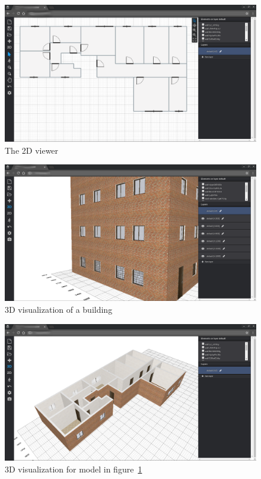 \begin{figure}[htb]
\centering
\includegraphics[width=\linewidth]{contents/images/fig-pianta}
\caption{The 2D viewer}
\label{fig2D}
\end{figure}

\begin{figure}[htb]
\centering
\includegraphics[width=\linewidth]{contents/images/palazzo2}
\caption{3D visualization of a building}
\label{fig3D-palace}
\end{figure}

\begin{figure}[htb]
\centering
\includegraphics[width=\linewidth]{contents/images/fig-pianta-3d}
\caption{3D visualization for model in figure~\ref{fig2D}}
\label{fig3D}
\end{figure}

